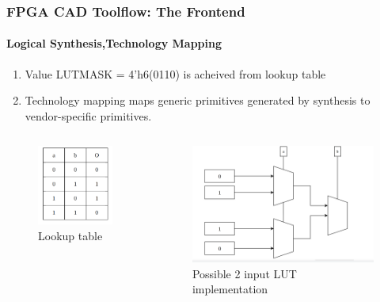\documentclass{beamer}
\begin{document}
{\begin{frame}[fragile]
    \frametitle{FPGA CAD Toolflow: The Frontend}
    \framesubtitle{Logical Synthesis,Technology Mapping}
    \begin{enumerate}
      \item Value LUTMASK = 4'h6(0110) is acheived from lookup table  
      \item Technology mapping maps generic primitives generated by synthesis to
        vendor-specific primitives. 
    \end{enumerate}
  \begin{columns}
   \begin{column}{0.5\textwidth}
   \begin{figure}[h]
       \centering
       \includegraphics[width=0.75\linewidth]{images/lookup_table.png}
       \caption{Lookup table}
       \label{exa_block1}
    \end{figure}
    \end{column}
   \begin{column}{0.5\textwidth}		
   \begin{figure}[h]
       \centering
       \includegraphics[width=0.85\linewidth]{images/lut.png} 
       \caption{Possible 2 input LUT implementation  }
       \label{exa_block2}
    \end{figure}
   \end{column}
   \end{columns}


\end{frame}}
\end{document}
